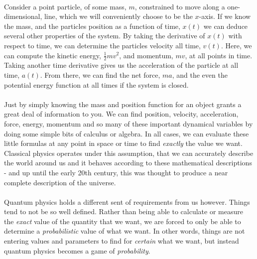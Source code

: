 \documentclass[12pt,letterpaper]{book}
\begin{document}

\paragraph*{}Consider a point particle, of some mass, $m$, constrained to move along a one-dimensional, line, which we will conveniently choose to be the $x$-axis. If we know the mass, and the particles position as a function of time, $x(t)$ we can deduce several other properties of the system. By taking the derivative of $x(t)$ with respect to time, we can determine the particles velocity all time, $v(t)$. Here, we can compute the kinetic energy, $\frac{1}{2}mv^2$, and momentum, $mv$, at all points in time. Taking another time derivative gives us the acceleration of the particle at all time, $a(t)$. From there, we can find the net force, $ma$, and the even the potential energy function at all times if the system is closed.

\paragraph*{}Just by simply knowing the mass and position function for an object grants a great deal of information to you. We can find position, velocity, acceleration, force, energy, momentum and so many of these important dynamical variables by doing some simple bits of calculus or algebra. In all cases, we can evaluate these little formulas at any point in space or time to find \textit{exactly} the value we want. Classical physics operates under this assumption, that we can accurately describe the world around us and it behaves according to these mathematical descriptions - and up until the early 20th century, this was thought to produce a near complete description of the universe.

\paragraph*{}Quantum physics holds a different sent of requirements from us however. Things tend to not be so well defined. Rather than being able to calculate or measure the \textit{exact} value of the quantity that we want, we are forced to only be able to determine a \textit{probabilistic} value of what we want. In other words, things are not entering values and parameters to find for \textit{certain} what we want, but instead quantum physics becomes a game of \textit{probability}.
\end{document}
